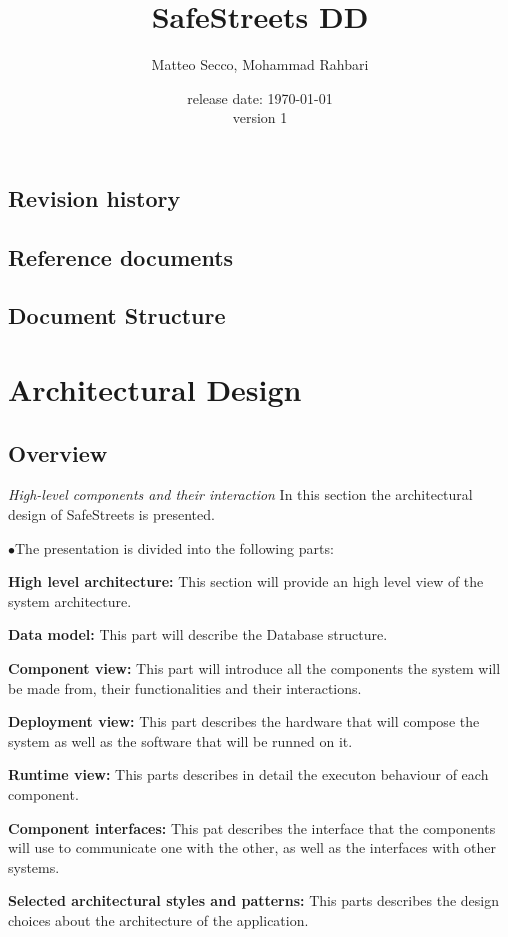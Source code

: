 \documentclass{article}
\title{SafeStreets DD}
\date{release date: \today\\version 1}
\author{Matteo Secco, Mohammad Rahbari}
\begin{document}
\maketitle
\newpage
\tableofcontents
\pagebreak
{}


	\subsection{Revision history}
	\subsection{Reference documents}
	\subsection{Document Structure}

\section{Architectural Design}
	\subsection{Overview} \textit{High-level components and their interaction}
	In this section the architectural design of SafeStreets is presented. 
	\begin{list}{$\bullet$}{The presentation is divided into the following parts:}
		\item \textbf{High level architecture:} 
			This section will provide an high level view of the system architecture.
		\item \textbf{Data model:}
			This part will describe the Database structure.
		\item \textbf{Component view:} 
			This part will introduce all the components the system will be made from, their functionalities and their interactions.
		\item \textbf{Deployment view:} 
			This part describes the hardware that will compose the system as well as the software that will be runned on it.
		\item \textbf{Runtime view:} 
			This parts describes in detail the executon behaviour of each component.
		\item \textbf{Component interfaces:} 
			This pat describes the interface that the components will use to communicate one with the other, as well as the interfaces with other
			systems.
		\item \textbf{Selected architectural styles and patterns:} 
			This parts describes the design choices  about the architecture of the application.
	\end{list}
\end{document}
